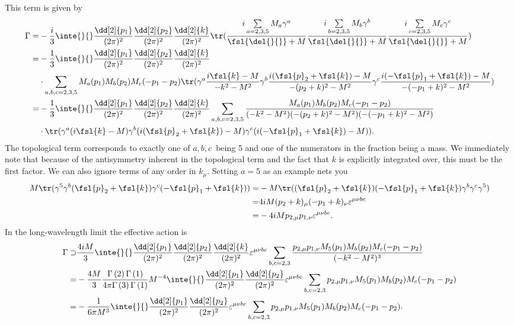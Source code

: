 This term is given by
\begin{align*}
	\Gamma =& -\frac{i}{3}\inte{}{}\frac{\dd[2]{p_{1}}}{(2\pi)^{2}}\frac{\dd[2]{p_{2}}}{(2\pi)^{2}}\frac{\dd[2]{k}}{(2\pi)^{2}}\tr(\frac{i\sum\limits_{a = 2, 3, 5}M_{a}\gamma^{a}}{\fsl{\del{}{}} + M}\frac{i\sum\limits_{b = 2, 3, 5}M_{b}\gamma^{b}}{\fsl{\del{}{}} + M}\frac{i\sum\limits_{c = 2, 3, 5}M_{c}\gamma^{c}}{\fsl{\del{}{}} + M}) \\
	       =& -\frac{1}{3}\inte{}{}\frac{\dd[2]{p_{1}}}{(2\pi)^{2}}\frac{\dd[2]{p_{2}}}{(2\pi)^{2}}\frac{\dd[2]{k}}{(2\pi)^{2}} \\
	        &\cdot\sum\limits_{a, b, c = 2, 3, 5}M_{a}(p_{1})M_{b}(p_{2})M_{c}(-p_{1} - p_{2})\tr(\gamma^{a}\frac{i\fsl{k} - M}{-k^{2} - M^{2}}\gamma^{b}\frac{i(\fsl{p}_{2} + \fsl{k}) - M}{-(p_{2} + k)^{2} - M^{2}}\gamma^{c}\frac{i(-\fsl{p}_{1} + \fsl{k}) - M}{-(-p_{1} + k)^{2} - M^{2}}) \\
	       =& -\frac{1}{3}\inte{}{}\frac{\dd[2]{p_{1}}}{(2\pi)^{2}}\frac{\dd[2]{p_{2}}}{(2\pi)^{2}}\frac{\dd[2]{k}}{(2\pi)^{2}}\sum\limits_{a, b, c = 2, 3, 5}\frac{M_{a}(p_{1})M_{b}(p_{2})M_{c}(-p_{1} - p_{2})}{(-k^{2} - M^{2})(-(p_{2} + k)^{2} - M^{2})(-(-p_{1} + k)^{2} - M^{2})} \\
	        &\cdot\tr(\gamma^{a}(i\fsl{k} - M)\gamma^{b}(i(\fsl{p}_{2} + \fsl{k}) - M)\gamma^{c}(i(-\fsl{p}_{1} + \fsl{k}) - M)).
\end{align*}
The topological term corresponds to exactly one of $a, b, c$ being 5 and one of the numerators in the fraction being a mass. We immediately note that because of the antisymmetry inherent in the topological term and the fact that $k$ is explicitly integrated over, this must be the first factor. We can also ignore terms of any order in $k_{\mu}$. Setting $a = 5$ as an example nets you
\begin{align*}
	  M\tr(\gamma^{5}\gamma^{b}(\fsl{p}_{2} + \fsl{k})\gamma^{c}(-\fsl{p}_{1} + \fsl{k})) =& -M\tr((\fsl{p}_{2} + \fsl{k})(-\fsl{p}_{1} + \fsl{k})\gamma^{b}\gamma^{c}\gamma^{5}) \\
	  =& 4iM(p_{2} + k)_{\mu}(-p_{1} + k)_{\nu}\varepsilon^{\mu\nu bc} \\
	  =& -4iMp_{2, \mu}p_{1, \nu}\varepsilon^{\mu\nu bc}.
\end{align*}
In the long-wavelength limit the effective action is
\begin{align*}
	\Gamma \supset& \frac{4iM}{3}\inte{}{}\frac{\dd[2]{p_{1}}}{(2\pi)^{2}}\frac{\dd[2]{p_{2}}}{(2\pi)^{2}}\frac{\dd[2]{k}}{(2\pi)^{2}}\varepsilon^{\mu\nu bc}\sum\limits_{b, c = 2, 3}\frac{p_{2, \mu}p_{1, \nu}M_{5}(p_{1})M_{b}(p_{2})M_{c}(-p_{1} - p_{2})}{(-k^{2} - M^{2})^{3}} \\
	             =& -\frac{4M}{3}\frac{\Gamma\left(2\right)\Gamma\left(1\right)}{4\pi\Gamma\left(3\right)\Gamma\left(1\right)}M^{-4}\inte{}{}\frac{\dd[2]{p_{1}}}{(2\pi)^{2}}\frac{\dd[2]{p_{2}}}{(2\pi)^{2}}\varepsilon^{\mu\nu bc}\sum\limits_{b, c = 2, 3}p_{2, \mu}p_{1, \nu}M_{5}(p_{1})M_{b}(p_{2})M_{c}(-p_{1} - p_{2}) \\
	             =& -\frac{1}{6\pi M^{3}}\inte{}{}\frac{\dd[2]{p_{1}}}{(2\pi)^{2}}\frac{\dd[2]{p_{2}}}{(2\pi)^{2}}\varepsilon^{\mu\nu bc}\sum\limits_{b, c = 2, 3}p_{2, \mu}p_{1, \nu}M_{5}(p_{1})M_{b}(p_{2})M_{c}(-p_{1} - p_{2}).
\end{align*}
